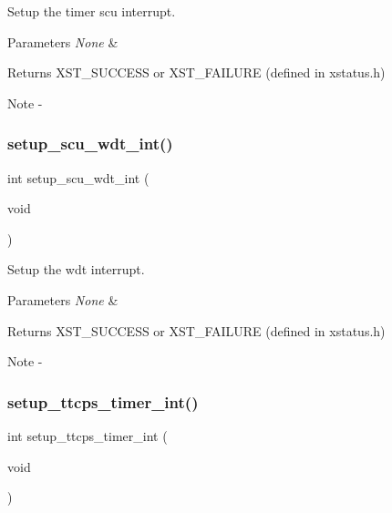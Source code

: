Setup the timer scu interrupt. 


\begin{DoxyParams}{Parameters}
{\em None} & \\
\hline
\end{DoxyParams}
\begin{DoxyReturn}{Returns}
X\+S\+T\+\_\+\+S\+U\+C\+C\+E\+SS or X\+S\+T\+\_\+\+F\+A\+I\+L\+U\+RE (defined in xstatus.\+h)
\end{DoxyReturn}
\begin{DoxyNote}{Note}
-\/ 
\end{DoxyNote}
\mbox{\label{interrupt_8c_af4e90ff15af4c3dfa9f1f64b8294ec55}} 
\subsubsection{setup\_scu\_wdt\_int()}
{\footnotesize\ttfamily int setup\+\_\+scu\+\_\+wdt\+\_\+int (\begin{DoxyParamCaption}\item[{void}]{ }\end{DoxyParamCaption})}



Setup the wdt interrupt. 


\begin{DoxyParams}{Parameters}
{\em None} & \\
\hline
\end{DoxyParams}
\begin{DoxyReturn}{Returns}
X\+S\+T\+\_\+\+S\+U\+C\+C\+E\+SS or X\+S\+T\+\_\+\+F\+A\+I\+L\+U\+RE (defined in xstatus.\+h)
\end{DoxyReturn}
\begin{DoxyNote}{Note}
-\/ 
\end{DoxyNote}
\mbox{\label{interrupt_8c_a692f02b0d05726afd233ea337f09ba7c}} 
\subsubsection{setup\_ttcps\_timer\_int()}
{\footnotesize\ttfamily int setup\+\_\+ttcps\+\_\+timer\+\_\+int (\begin{DoxyParamCaption}\item[{void}]{ }\end{DoxyParamCaption})}



